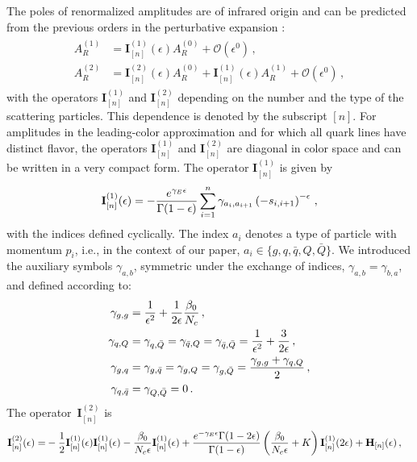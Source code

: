 The poles of renormalized amplitudes are of infrared origin and
can be predicted from the previous orders in the perturbative 
expansion 
\cite{Catani:1998bh,Sterman:2002qn,Becher:2009cu,Gardi:2009qi}:
\begin{align}
  \begin{split}\label{eq:catani}
    A_R^{(1)}&=\mathbf{I}^{(1)}_{[n]}(\epsilon)
    A_R^{(0)}+\mathcal{O}
    (\epsilon^0)\,,\\
    A_R^{(2)}&=\mathbf{I}^{(2)}_{[n]}(\epsilon)A_R^{(0)}+\mathbf{I}^{(1)}_{[n]}(\epsilon)
    A_R^{(1)}+\mathcal{O}(\epsilon^0)\,,
  \end{split}
\end{align}
with the operators $\mathbf{I}^{(1)}_{[n]}$ and
$\mathbf{I}^{(2)}_{[n]}$ depending on the number and the type of
the scattering particles. This dependence is denoted by the 
subscript $[n]$.
For amplitudes in the leading-color approximation and for which
all quark lines have distinct flavor, the operators
$\mathbf{I}^{(1)}_{[n]}$ and $\mathbf{I}^{(2)}_{[n]}$ are 
diagonal in color space and can be written in a very compact
form. The operator $\mathbf{I}^{(1)}_{[n]}$ is given by
%
\begin{equation}
  \mathbf{I}^{(1)}_{[n]}(\epsilon)=-\frac{e^{\gamma_E\epsilon}}{\Gamma(1-\epsilon)}
  \sum_{i=1}^n\gamma_{a_i,a_{i+1}}
  \left( -s_{i,i+1}\right)^{-\epsilon}\,,
\end{equation}
with the indices defined cyclically.
The index $a_i$ denotes a type of particle with momentum $p_i$, i.e., in the context of our paper,
$a_i\in\{g,q,\bar q, Q, \bar Q\}$. We introduced the auxiliary symbols $\gamma_{a,b}$, 
symmetric under the exchange of indices, 
$\gamma_{a,b}=\gamma_{b,a}$, and defined according to:
\begin{align}
  \begin{split}
    \gamma_{g,g}&=\frac{1}{\epsilon^2}+\frac{1}{2\epsilon}
    \frac{\beta_0}{{N_c}}\,, \\
    \gamma_{q,Q}&=\gamma_{q,\bar Q}=
    \gamma_{\bar q, Q}=\gamma_{\bar q, \bar Q} 
    =\frac{1}{\epsilon^2}+\frac{3}{2\epsilon}\,,\\
    \gamma_{g,q}&=\gamma_{g,\bar q}=
    \gamma_{g,Q}=\gamma_{g,\bar Q}=
    \frac{\gamma_{g,g}+\gamma_{q,Q}}{2}\,,\\
    \gamma_{q,\bar q}&=\gamma_{Q,\bar Q}=0\,.
  \end{split}
\end{align}
The operator~$\mathbf{I}^{(2)}_{[n]}$ is
\begin{align}
  \label{eqn:Iop}
  \begin{split} 
    \mathbf{I}^{(2)}_{[n]}(\epsilon)=&
    -\frac{1}{2}\mathbf{I}^{(1)}_{[n]}(\epsilon)\mathbf{I}^{(1)}_{[n]}(\epsilon)
    -\frac{\beta_0}{{N_c}\epsilon}\mathbf{I}^{(1)}_{[n]}(\epsilon) + 
    \frac{e^{-\gamma_E\epsilon}\Gamma(1-2\epsilon)}
    {\Gamma(1-\epsilon)}
    \left(\frac{\beta_0}{{N_c}\epsilon}+K\right)
    \mathbf{I}^{(1)}_{[n]}(2\epsilon) + 
    \mathbf{H}_{[n]}(\epsilon)\,,
  \end{split}
\end{align}
